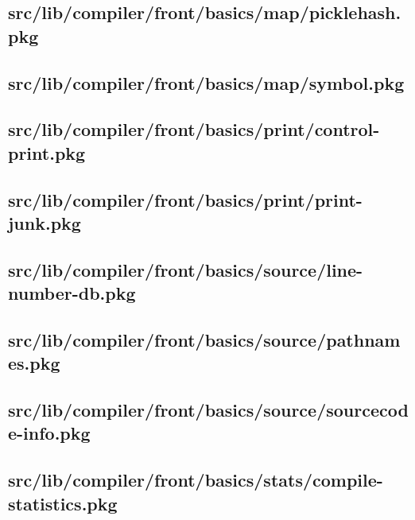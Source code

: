 \subsection{src/lib/compiler/front/basics/map/picklehash.pkg}


\subsection{src/lib/compiler/front/basics/map/symbol.pkg}


\subsection{src/lib/compiler/front/basics/print/control-print.pkg}


\subsection{src/lib/compiler/front/basics/print/print-junk.pkg}


\subsection{src/lib/compiler/front/basics/source/line-number-db.pkg}


\subsection{src/lib/compiler/front/basics/source/pathnames.pkg}


\subsection{src/lib/compiler/front/basics/source/sourcecode-info.pkg}


\subsection{src/lib/compiler/front/basics/stats/compile-statistics.pkg}


